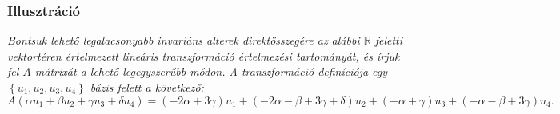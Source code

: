 \documentclass[9pt, a4paper, showtrims]{memoir}
\theoremstyle{plain}
\theoremstyle{remark}
\theoremstyle{definition}
\begin{document}
    \subsubsection{Illusztráció}
    \textit{%
        Bontsuk lehető legalacsonyabb invariáns alterek direktösszegére az alábbi $\mathbb{R}$
        feletti vektortéren értelmezett lineáris transzformáció értelmezési tartományát,
        és írjuk fel $A$ mátrixát a lehető legegyszerűbb módon.
        A transzformáció definíciója egy 
        $\left\{
            u_1,u_2,u_3,u_4
        \right\}
        $
        bázis felett a következő:
        \[
            A
            \left( 
            \alpha u_1
            +
            \beta u_2
            +
            \gamma u_3
            +
            \delta u_4
            \right)
            =
            \left( -2\alpha + 3\gamma \right)u_1
            +
            \left( -2\alpha-\beta+3\gamma+\delta \right)u_2
            +
            \left( -\alpha+\gamma \right)u_3
            +
            \left( -\alpha-\beta+3\gamma \right)u_4.
        \]
    }
\end{document}
